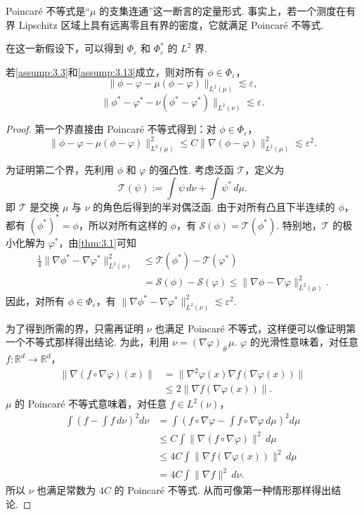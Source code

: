 Poincar\'e 不等式是“$\mu$ 的支集连通”这一断言的定量形式. 事实上，若一个测度在有界 Lipschitz 区域上具有远离零且有界的密度，它就满足 Poincar\'e 不等式.

在这一新假设下，可以得到 $\Phi_\varepsilon$ 和 $\Phi_\varepsilon^*$ 的 $L^2$ 界.
\begin{proposition}\label{prop:3.14}
若\autoref{assump:3.3}和\autoref{assump:3.13}成立，则对所有 $\phi\in\Phi_\varepsilon$，
$$\|\phi-\varphi-\mu(\phi-\varphi)\|_{L^2(\mu)}\lesssim\varepsilon,$$
$$\|\phi^*-\varphi^*-\nu(\phi^*-\varphi^*)\|_{L^2(\nu)}\lesssim\varepsilon.$$
\end{proposition}
\begin{proof}
第一个界直接由 Poincar\'e 不等式得到：对 $\phi\in\Phi_\varepsilon$，
$$\|\phi-\varphi-\mu(\phi-\varphi)\|_{L^2(\mu)}^2
\le C\|\nabla(\phi-\varphi)\|_{L^2(\mu)}^2\lesssim\varepsilon^2.$$

为证明第二个界，先利用 $\phi$ 和 $\varphi$ 的强凸性. 考虑泛函 $\mathcal T$，定义为
$$\mathcal T(\psi):=\int\psi\,d\nu+\int\psi^*\,d\mu.$$
即 $\mathcal T$ 是交换 $\mu$ 与 $\nu$ 的角色后得到的半对偶泛函. 由于对所有凸且下半连续的 $\phi$，都有 $(\phi^*)^*=\phi$，所以对所有这样的 $\phi$，有 $\mathcal S(\phi)=\mathcal T(\phi^*)$. 特别地，$\mathcal T$ 的极小化解为 $\varphi^*$，由\autoref{thm:3.1}可知
$$\begin{aligned}
\frac14\|\nabla\phi^*-\nabla\varphi^*\|_{L^2(\nu)}^2
&\le\mathcal T(\phi^*)-\mathcal T(\varphi^*)\\
&=\mathcal S(\phi)-\mathcal S(\varphi)
\le\|\nabla\phi-\nabla\varphi\|_{L^2(\mu)}^2.
\end{aligned}$$
因此，对所有 $\phi\in\Phi_\varepsilon$，有 $\|\nabla\phi^*-\nabla\varphi^*\|_{L^2(\nu)}^2\lesssim\varepsilon^2$.

为了得到所需的界，只需再证明 $\nu$ 也满足 Poincar\'e 不等式，这样便可以像证明第一个不等式那样得出结论. 为此，利用 $\nu=(\nabla\varphi)_\#\mu$. $\varphi$ 的光滑性意味着，对任意 $f:\mathbb R^d\to\mathbb R^d$，
$$\begin{aligned}
\|\nabla(f\circ\nabla\varphi)(x)\|
&=\|\nabla^2\varphi(x)\nabla f(\nabla\varphi(x))\|\\
&\le2\|\nabla f(\nabla\varphi(x))\|.
\end{aligned}$$
$\mu$ 的 Poincar\'e 不等式意味着，对任意 $f\in L^2(\nu)$，
$$\begin{aligned}
\int\left(f-\int f\,d\nu\right)^2d\nu
&=\int\left(f\circ\nabla\varphi-\int f\circ\nabla\varphi\,d\mu\right)^2d\mu\\
&\le C\int\|\nabla(f\circ\nabla\varphi)\|^2\,d\mu\\
&\le4C\int\|\nabla f(\nabla\varphi(x))\|^2\,d\mu\\
&=4C\int\|\nabla f\|^2\,d\nu.
\end{aligned}$$
所以 $\nu$ 也满足常数为 $4C$ 的 Poincar\'e 不等式. 从而可像第一种情形那样得出结论.
\end{proof}

